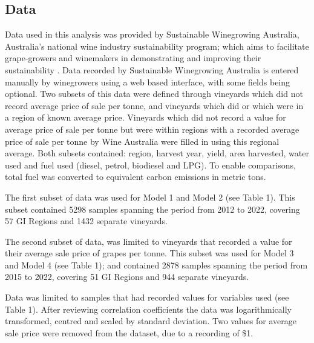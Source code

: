 \documentclass[review,12pt,authoryear]{elsarticle}
\begin{document}
\begin{linenumbers}
\subsection{Data}
Data used in this analysis was provided by Sustainable Winegrowing Australia, Australia's national wine industry sustainability program; which aims to facilitate grape-growers and winemakers in demonstrating and improving their sustainability \citep{swaSustainableWingrowingAustralia2022}. Data recorded by Sustainable Winegrowing Australia is entered manually by winegrowers using a web based interface, with some fields being optional. Two subsets of this data were defined through vineyards which did not record average price of sale per tonne, and vineyards which did or which were in a region of known average price. Vineyards which did not record a value for average price of sale per tonne but were within regions with a recorded average price of sale per tonne by Wine Australia were filled in using this regional average. Both subsets contained: region, harvest year, yield, area harvested, water used and fuel used (diesel, petrol, biodiesel and LPG). To enable comparisons, total fuel was converted to equivalent carbon emissions in metric tons. 

The first subset of data was used for Model 1 and Model 2 (see Table 1). This subset contained 5298 samples spanning the period from 2012 to 2022, covering 57 GI Regions and 1432 separate vineyards.

The second subset of data, was limited to vineyards that recorded a value for their average sale price of grapes per tonne. This subset was used for Model 3 and Model 4 (see Table 1); and contained 2878 samples spanning the period from 2015 to 2022, covering 51 GI Regions and 944 separate vineyards.

Data was limited to samples that had recorded values for variables used (see Table 1). After reviewing correlation coefficients the data was logarithmically transformed, centred and scaled by standard deviation. Two values for average sale price were removed from the dataset, due to a recording of \$1. 


\end{linenumbers}
\end{document}
